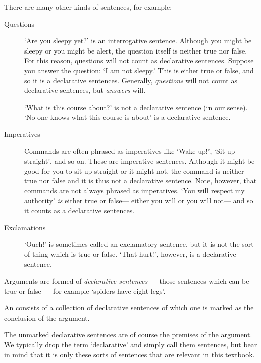 There are many other kinds of sentences, for example:
\begin{description}
\item[{Questions}] `Are you sleepy yet?' is an interrogative sentence. Although you might be sleepy or you might be alert, the question itself is neither true nor false. For this reason, questions will not count as declarative sentences. Suppose you answer the question: `I am not sleepy.' This is either true or false, and so it is a declarative sentences. Generally, \emph{questions} will not count as declarative sentences, but \emph{answers} will.

`What is this course about?' is not a declarative sentence (in our sense). `No one knows what this course is about' is a declarative sentence.

\item[{Imperatives}] Commands are often phrased as imperatives like `Wake up!', `Sit up straight', and so on. These are imperative sentences. Although it might be good for you to sit up straight or it might not, the command is neither true nor false and it is thus not a declarative sentence. Note, however, that commands are not always phrased as imperatives. `You will respect my authority' \emph{is} either true or false--- either you will or you will not--- and so it counts as a declarative sentences.

\item[{Exclamations}] `Ouch!' is sometimes called an exclamatory sentence, but it is not the sort of thing which is true or false. `That hurt!', however, is a declarative sentence.

\end{description}

Arguments are formed of \emph{declarative sentences} --- those sentences which can be true or false --- for example `spiders have eight legs'.

\begin{highlighted}An  consists of a collection of declarative sentences of which one is marked as the conclusion of the argument.\end{highlighted}


The unmarked declarative sentences are of course the premises of the argument. We typically drop the term `declarative' and simply call them sentences, but bear in mind that it is only these sorts of sentences that are relevant in this textbook.

